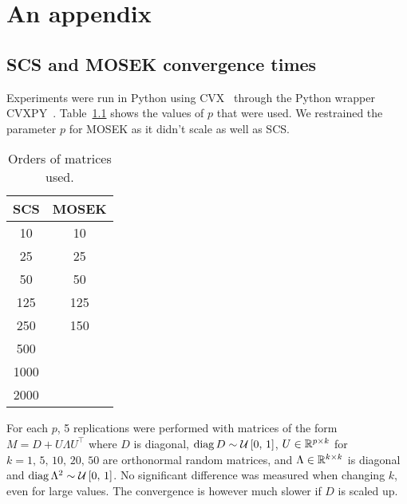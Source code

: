 \appendix
\chapter{An appendix}\label{ch:appendix}

\section{SCS and MOSEK convergence times}\label{sec:cvx_times}

Experiments were run in Python using CVX~\cite{cvx} through the Python wrapper CVXPY~\cite{cvxpy}.
Table~\ref{tab:cvx_times_ps} shows the values of $p$ that were used.
We restrained the parameter $p$ for MOSEK as it didn't scale as well as SCS\@.
\begin{table}[!htb]
    \centering
    \setlength{\tabcolsep}{2pt}
    {\small
    \begin{tabular}{|c|c|}\hline
    \textbf{SCS} & \textbf{MOSEK}\\ \hline
        10 & 10\\ \hline
        25 & 25\\ \hline
        50 & 50\\ \hline
        125 & 125\\ \hline
        250 & 150\\ \hline
        500 &\\ \hline
        1000 &\\ \hline
        2000 &\\ \hline
    \end{tabular}
    }%
    \caption[short]{
        Orders of matrices used.
    }
    \label{tab:cvx_times_ps}
\end{table}
For each $p$, 5 replications were performed with matrices of the form $M = D + U \Lambda U^\top$ where $D$ is diagonal,
$\operatorname*{diag} D \sim \mathcal{U}\left[ 0,\, 1 \right]$, $U \in \mathbb{R}^{p \times k}$ for $k = 1,\, 5,\, 10,\, 20,\, 50$
are orthonormal random matrices, and $\Lambda \in \mathbb{R}^{k \times k}$ is diagonal and
$\operatorname*{diag} \Lambda^2 \sim \mathcal{U}\left[ 0,\, 1 \right]$.
No significant difference was measured when changing $k$, even for large values.
The convergence is however much slower if $D$ is scaled up.
